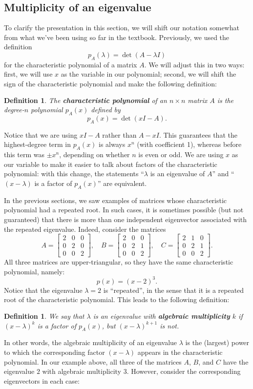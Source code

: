 \documentclass[12pt,letterpaper]{article}
\newtheorem{definition}[theorem]{Definition}
\newcommand{\bbm}{\begin{bmatrix}}
\newcommand{\ebm}{\end{bmatrix}}
\begin{document}
\subsection{Multiplicity of an eigenvalue}
To clarify the presentation in this section, we will shift our notation somewhat from what we've been using so far in the textbook. Previously, we used the definition
\[
 p_A(\lambda) = \det(A-\lambda I)
\]
for the characteristic polynomial of a matrix $A$. We will adjust this in two ways: first, we will use $x$ as the variable in our polynomial; second, we will shift the sign of the characteristic polynomial and make the following definition:
\begin{definition}
 The \textbf{characteristic polynomial} of an $n\times n$ matrix $A$ is the degree-$n$ polynomial $p_A(x)$ defined by
\[
 p_A(x) = \det(xI-A).
\]
\end{definition}
Notice that we are using $xI-A$ rather than $A-xI$. This guarantees that the highest-degree term in $p_A(x)$ is always $x^n$ (with coefficient 1), whereas before this term was $\pm x^n$, depending on whether $n$ is even or odd. We are using $x$ as our variable to make it easier to talk about factors of the characteristic polynomial: with this change, the statements ``$\lambda$ is an eigenvalue of $A$'' and ``$(x-\lambda)$ is a factor of $p_A(x)$'' are equivalent.

In the previous sections, we saw examples of matrices whose characteristic polynomial had a repeated root. In such cases, it is sometimes possible (but not guaranteed) that there is more than one independent eigenvector associated with the repeated eigenvalue. Indeed, consider the matrices
\[
 A = \bbm 2&0&0\\0&2&0\\0&0&2\ebm, \quad B = \bbm 2&0&0\\0&2&1\\0&0&2\ebm, \quad C = \bbm 2&1&0\\0&2&1\\0&0&2\ebm.
\]
All three matrices are upper-triangular, so they have the same characteristic polynomial, namely:
\[
 p(x) = (x-2)^3.
\]
Notice that the eigenvalue $\lambda = 2$ is ``repeated'', in the sense that it is a repeated root of the characteristic polynomial. This leads to the following definition:
\begin{definition}
 We say that $\lambda$ is an eigenvalue with \textbf{algebraic multiplicity} $k$ if $(x-\lambda)^k$ is a factor of $p_A(x)$, but $(x-\lambda)^{k+1}$ is not.
\end{definition}
In other words, the algebraic multiplicity of an eigenvalue $\lambda $ is the (largest) power to which the corresponding factor $(x-\lambda)$ appears in the characteristic polynomial. In our example above, all three of the matrices $A$, $B$, and $C$ have the eigenvalue $2$ with algebraic multiplicity 3. However, consider the corresponding eigenvectors in each case:
\end{document}
